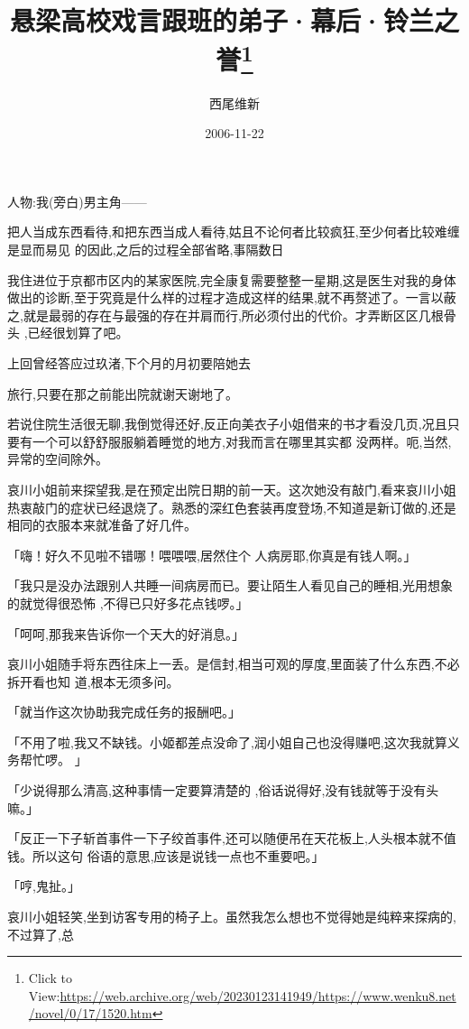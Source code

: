\documentclass{article}
\title{悬梁高校戏言跟班的弟子·幕后·铃兰之誉\footnote{Click to View:\url{https://web.archive.org/web/20230123141949/https://www.wenku8.net/novel/0/17/1520.htm}}}
\author{西尾维新}
\date{2006-11-22}
\begin{document}

\maketitle


\Large


﻿人物:我(旁白)男主角—— 

把人当成东西看待,和把东西当成人看待,姑且不论何者比较疯狂,至少何者比较难缠是显而易见
的因此,之后的过程全部省略,事隔数日 

我住进位于京都市区内的某家医院,完全康复需要整整一星期,这是医生对我的身体做出的诊断,至于究竟是什么样的过程才造成这样的结果,就不再赘述了。一言以蔽之,就是最弱的存在与最强的存在并肩而行,所必须付出的代价。才弄断区区几根骨头
,已经很划算了吧。 

上回曾经答应过玖渚,下个月的月初要陪她去

\newpage
旅行,只要在那之前能出院就谢天谢地了。 

若说住院生活很无聊,我倒觉得还好,反正向美衣子小姐借来的书才看没几页,况且只要有一个可以舒舒服服躺着睡觉的地方,对我而言在哪里其实都
没两样。呃,当然,异常的空间除外。 

哀川小姐前来探望我,是在预定出院日期的前一天。这次她没有敲门,看来哀川小姐热衷敲门的症状已经退烧了。熟悉的深红色套装再度登场,不知道是新订做的,还是相同的衣服本来就准备了好几件。
 

「嗨！好久不见啦不错哪！喂喂喂,居然住个
人病房耶,你真是有钱人啊。」 

「我只是没办法跟别人共睡一间病房而已。要让陌生人看见自己的睡相,光用想象的就觉得很恐怖
,不得已只好多花点钱啰。」 

「呵呵,那我来告诉你一个天大的好消息。」

\newpage

哀川小姐随手将东西往床上一丢。是信封,相当可观的厚度,里面装了什么东西,不必拆开看也知
道,根本无须多问。 


「就当作这次协助我完成任务的报酬吧。」 

「不用了啦,我又不缺钱。小姬都差点没命了,润小姐自己也没得赚吧,这次我就算义务帮忙啰。
」 

「少说得那么清高,这种事情一定要算清楚的
,俗话说得好,没有钱就等于没有头嘛。」 

「反正一下子斩首事件一下子绞首事件,还可以随便吊在天花板上,人头根本就不值钱。所以这句
俗语的意思,应该是说钱一点也不重要吧。」 


「哼,鬼扯。」 

哀川小姐轻笑,坐到访客专用的椅子上。虽然我怎么想也不觉得她是纯粹来探病的,不过算了,总
\newpage
\end{document}

